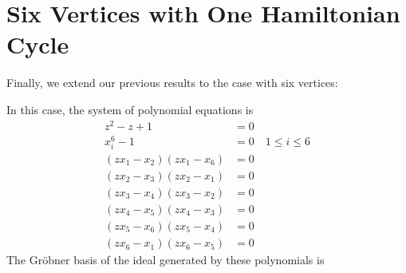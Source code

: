 \documentclass[letterpaper]{article}
\newcommand{\aln}[1]{\begin{align*} #1 \end{align*}} %
\begin{document}
\newpage

\section{Six Vertices with One Hamiltonian Cycle}
Finally, we extend our previous results to the case with six vertices:
\begin{center}
\end{center}
In this case, the system of polynomial equations is
\aln{
  z^2 - z + 1 &= 0\\
  x_i^6 - 1 &= 0 \quad 1 \leq i \leq 6\\
  (z x_1 - x_2) (z x_1 - x_6) &= 0\\
  (z x_2 - x_3) (z x_2 - x_1) &= 0\\
  (z x_3 - x_4) (z x_3 - x_2) &= 0\\
  (z x_4 - x_5) (z x_4 - x_3) &= 0\\
  (z x_5 - x_6) (z x_5 - x_4) &= 0\\
  (z x_6 - x_1) (z x_6 - x_5) &= 0
}
The Gr\"obner basis of the ideal generated by these polynomials is
\end{document}
